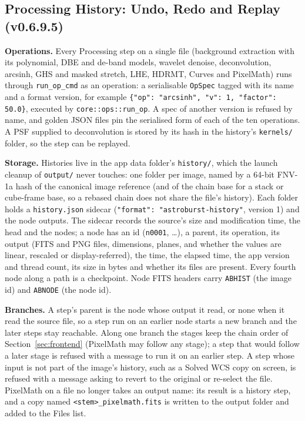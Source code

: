 \documentclass[11pt,a4paper]{article}
\newcommand{\code}[1]{\texttt{\small #1}}
\begin{document}
    \subsection{Processing History: Undo, Redo and Replay (v0.6.9.5)}
    \label{sec:history}

    \textbf{Operations.} Every Processing step on a single file (background extraction with its polynomial, DBE and de-band models, wavelet denoise, deconvolution, arcsinh, GHS and masked stretch, LHE, HDRMT, Curves and PixelMath) runs through \code{run\_op\_cmd} as an operation: a serialisable \code{OpSpec} tagged with its name and a format version, for example \code{\{"op": "arcsinh", "v": 1, "factor": 50.0\}}, executed by \code{core::ops::run\_op}. A spec of another version is refused by name, and golden JSON files pin the serialised form of each of the ten operations. A PSF supplied to deconvolution is stored by its hash in the history's \code{kernels/} folder, so the step can be replayed.

    \textbf{Storage.} Histories live in the app data folder's \code{history/}, which the launch cleanup of \code{output/} never touches: one folder per image, named by a 64-bit FNV-1a hash of the canonical image reference (and of the chain base for a stack or cube-frame base, so a rebased chain does not share the file's history). Each folder holds a \code{history.json} sidecar (\code{"format": "astroburst-history"}, version 1) and the node outputs. The sidecar records the source's size and modification time, the head and the nodes; a node has an id (\code{n0001}, \ldots), a parent, its operation, its output (FITS and PNG files, dimensions, planes, and whether the values are linear, rescaled or display-referred), the time, the elapsed time, the app version and thread count, its size in bytes and whether its files are present. Every fourth node along a path is a checkpoint. Node FITS headers carry \code{ABHIST} (the image id) and \code{ABNODE} (the node id).

    \textbf{Branches.} A step's parent is the node whose output it read, or none when it read the source file, so a step run on an earlier node starts a new branch and the later steps stay reachable. Along one branch the stages keep the chain order of Section~\ref{sec:frontend} (PixelMath may follow any stage); a step that would follow a later stage is refused with a message to run it on an earlier step. A step whose input is not part of the image's history, such as a Solved WCS copy on screen, is refused with a message asking to revert to the original or re-select the file. PixelMath on a file no longer takes an output name: its result is a history step, and a copy named \code{<stem>\_pixelmath.fits} is written to the output folder and added to the Files list.
\end{document}
